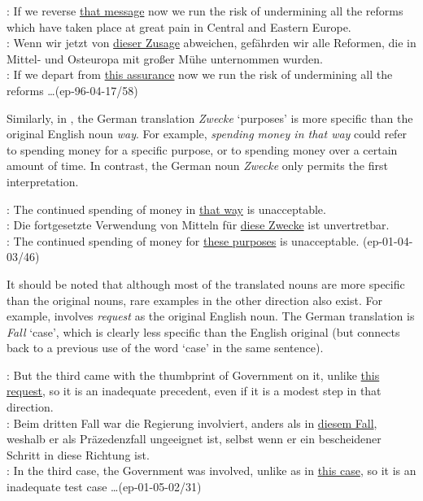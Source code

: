 \documentclass[output=paper]{LSP/langsci}
\begin{document}
\ea	\label{ex:zusage} %
\ENo : If we reverse \ul{that message} now we run the risk of undermining all the reforms which have taken place at great pain in Central and Eastern Europe. \\
\DEt : Wenn wir jetzt von \ul{dieser Zusage} abweichen, gef\"ahrden wir alle Reformen, die in Mittel- und Osteuropa mit gro\ss er M\"uhe unternommen wurden. \\
\DElit : If we depart from \ul{this assurance} now we run the risk of undermining all the reforms \dots \hfill{(ep-96-04-17/58)}
\z

Similarly, in , the German translation {\it Zwecke} `purposes' is more specific than the original English noun {\it way}. For example, {\it spending money in that way} could refer to spending money for a specific purpose, or to spending money over a certain amount of time. In contrast, the German noun {\it Zwecke} only permits the first interpretation.

\ea	\label{ex:zwecke}%
\ENo : The continued spending of money in \ul{that way} is unacceptable. \\
\DEt : Die fortgesetzte Verwendung von Mitteln f\"ur \ul{diese Zwecke} ist unvertretbar. \\
\DElit : The continued spending of money for \ul{these purposes} is unacceptable. \hfill{(ep-01-04-03/46)} 
\z

It should be noted that although most of the translated nouns are more specific than the original nouns, rare  examples in the other direction also exist. For example,  involves {\it request} as the original English noun. The German translation is {\it Fall} `case', which is clearly less specific than the English original (but connects back to a previous use of the word `case' in the same sentence).  

\ea	\label{ex:fall} %
\ENo : But the third came with the thumbprint of Government on it, unlike \ul{this request}, so it is an inadequate precedent, even if it is a modest step in that direction.\\
\DEt : Beim dritten Fall war die Regierung involviert, anders als in \ul{diesem Fall}, weshalb er als Pr\"azedenzfall ungeeignet ist, selbst wenn er ein bescheidener Schritt in diese Richtung ist.\\
\DElit : In the third case, the Government was involved, unlike as in \ul{this case}, so it is an inadequate test case \dots \hfill{(ep-01-05-02/31)}%
\z
\end{document}
